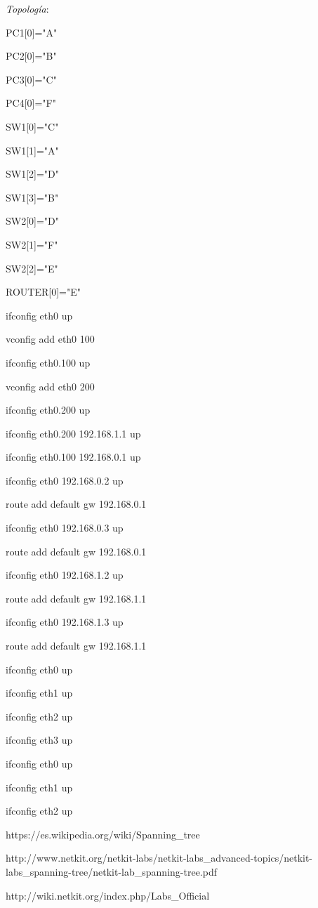 \documentclass{article}
\begin{document}
\textit{Topología}:

PC1[0]="A"

PC2[0]="B"

PC3[0]="C"

PC4[0]="F"


SW1[0]="C"

SW1[1]="A"

SW1[2]="D"

SW1[3]="B"

SW2[0]="D"

SW2[1]="F"

SW2[2]="E"

ROUTER[0]="E"


ifconfig eth0 up

vconfig add eth0 100

ifconfig eth0.100 up

vconfig add eth0 200

ifconfig eth0.200 up

ifconfig eth0.200 192.168.1.1 up

ifconfig eth0.100 192.168.0.1 up


ifconfig eth0 192.168.0.2 up

route add default gw 192.168.0.1


ifconfig eth0 192.168.0.3 up

route add default gw 192.168.0.1


ifconfig eth0 192.168.1.2 up

route add default gw 192.168.1.1


ifconfig eth0 192.168.1.3 up

route add default gw 192.168.1.1


ifconfig eth0 up

ifconfig eth1 up

ifconfig eth2 up

ifconfig eth3 up


ifconfig eth0 up

ifconfig eth1 up

ifconfig eth2 up


https://es.wikipedia.org/wiki/Spanning_tree

http://www.netkit.org/netkit-labs/netkit-labs_advanced-topics/netkit-labs_spanning-tree/netkit-lab_spanning-tree.pdf

http://wiki.netkit.org/index.php/Labs_Official
\end{document}
